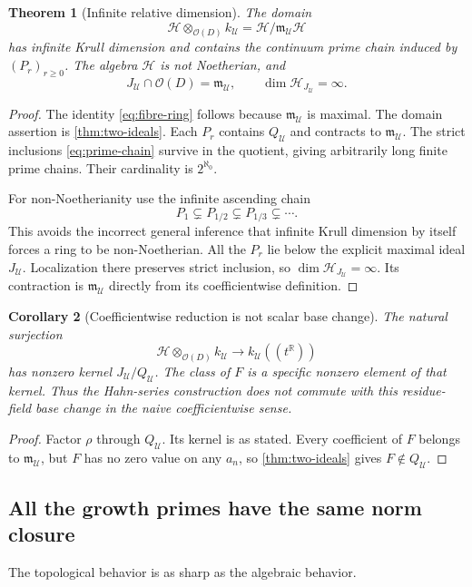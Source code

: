 \documentclass[11pt,letterpaper]{article}
\numberwithin{equation}{section}
\newtheorem{theorem}{Theorem}[section]
\newtheorem{corollary}[theorem]{Corollary}
\theoremstyle{definition}
\theoremstyle{remark}
\newcommand{\R}{\mathbb R}
\newcommand{\OO}{\mathcal O}
\newcommand{\HH}{\mathcal H}
\newcommand{\UU}{\mathcal U}
\newcommand{\mm}{\mathfrak m}
\begin{document}
\begin{theorem}[Infinite relative dimension]\label{thm:fibre}
The domain
\begin{equation}\label{eq:fibre-ring}
 \HH\otimes_{\OO(D)}k_\UU=\HH/\mm_\UU\HH
\end{equation}
has infinite Krull dimension and contains the continuum prime chain
induced by $(P_r)_{r\ge0}$. The algebra $\HH$ is not Noetherian, and
\[
 J_\UU\cap\OO(D)=\mm_\UU,\qquad \dim\HH_{J_\UU}=\infty.
\]
\end{theorem}
\begin{proof}
The identity \eqref{eq:fibre-ring} follows because $\mm_\UU$ is maximal.
The domain assertion is \cref{thm:two-ideals}. Each $P_r$ contains
$Q_\UU$ and contracts to $\mm_\UU$. The strict inclusions
\eqref{eq:prime-chain} survive in the quotient, giving arbitrarily long
finite prime chains. Their cardinality is $2^{\aleph_0}$.

For non-Noetherianity use the infinite ascending chain
\[
 P_1\subsetneq P_{1/2}\subsetneq P_{1/3}\subsetneq\cdots.
\]
This avoids the incorrect general inference that infinite Krull
dimension by itself forces a ring to be non-Noetherian. All the $P_r$
lie below the explicit maximal ideal $J_\UU$. Localization there
preserves strict inclusion, so $\dim\HH_{J_\UU}=\infty$. Its contraction
is $\mm_\UU$ directly from its coefficientwise definition.
\end{proof}

\begin{corollary}[Coefficientwise reduction is not scalar base change]
\label{cor:basechange}
The natural surjection
\[
 \HH\otimes_{\OO(D)}k_\UU\longrightarrow k_\UU((t^\R))
\]
has nonzero kernel $J_\UU/Q_\UU$. The class of $F$ is a specific nonzero
element of that kernel. Thus the Hahn-series construction does not
commute with this residue-field base change in the naive coefficientwise
sense.
\end{corollary}
\begin{proof}
Factor $\rho$ through $Q_\UU$. Its kernel is as stated. Every
coefficient of $F$ belongs to $\mm_\UU$, but $F$ has no zero value on
any $a_n$, so \cref{thm:two-ideals} gives $F\notin Q_\UU$.
\end{proof}

\subsection{All the growth primes have the same norm closure}
The topological behavior is as sharp as the algebraic behavior.
\end{document}
